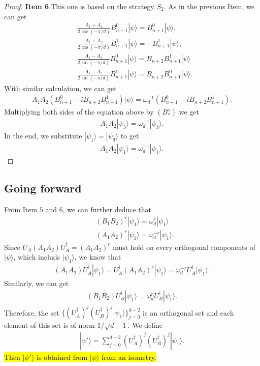 \documentclass[11pt,letterpaper]{article}
\newcommand{\ket}[1]{|#1\rangle}
\newcommand{\ct}{^{\dagger}}
\newcommand{\1}{\mathbb{1}}
\theoremstyle{definition}
\begin{document}
\begin{proof}
	\textbf{Item 6}.This one is based on the strategy $S_2$. As in the previous Item,
	we can get
	\begin{align}
		&\frac{A_1+A_2}{2 \cos(-\pi/d)} B_{n+1}^0 \ket{\psi} = B_{n+1}^0 \ket{\psi}.\\
		&\frac{A_1+A_2}{2 \cos(-\pi/d)} B_{n+1}^1 \ket{\psi} = -B_{n+1}^1 \ket{\psi},\\
		&\frac{A_1-A_2}{2 \sin(-\pi/d)} B_{n+1}^0\ket{\psi} =B_{n+2} B_{n+1}^1\ket{\psi}\\
		&\frac{A_1 -A_2}{2\sin(-\pi/d)} B_{n+1}^1 \ket{\psi} = B_{n+2} B_{n+1}^0 \ket{\psi}.
	\end{align}
	With similar calculation, we can get 
	\begin{align}
		A_1A_2 (B_{n+1}^0 - i B_{n+2}B_{n+1}^1) \ket{\psi} = \omega_d^{-1} (B_{n+1}^0 - i B_{n+2}B_{n+1}^1).
	\end{align}
	Multiplying both sides of the equation above by $(B_\ast^\diamond)$ we get
	\begin{align}
		A_1A_2 \ket{\psi_3} = \omega_d^{-1}\ket{\psi_3}.
	\end{align}
	In the end, we substitute $\ket{\psi_1} = \ket{\psi_3}$ to get
	\begin{align}
		A_1A_2 \ket{\psi_1} = \omega_d^{-1}\ket{\psi_1}.
	\end{align}
\end{proof}
\subsection{Going forward}
From Item $5$ and $6$, we can further deduce that 
\begin{align}
	&(B_1B_2)^r \ket{\psi_1} = \omega_d^r \ket{\psi_1} \\
	&(A_1A_2)^r \ket{\psi_1} = \omega_d^{-r} \ket{\psi_1}.
\end{align}
Since $U_A(A_1A_2)U_A\ct = (A_1A_2)^r$ must hold on every orthogonal components of $\ket{\psi}$, which includs $\ket{\psi_1}$,
we know that 
\begin{align}
	(A_1A_2)U_A\ct \ket{\psi_1} = U_A\ct (A_1A_2)^r \ket{\psi_1} = \omega_d^{-r} U_A\ct \ket{\psi_1}.
\end{align}
Similarly, we can get 
\begin{align}
	(B_1B_2)U_B\ct \ket{\psi_1} = \omega_d^r U_B\ct \ket{\psi_1}.
\end{align}
Therefore, the set $\{ (U_A\ct)^j(U_B\ct)^j \ket{\psi_1}\}_{j=0}^{d-2}$ is an orthogonal set and
each element of this set is of norm $1/\sqrt{d-1}$.
We define 
\begin{align}
	\ket{\psi'} = \sum_{j=0}^{d-2} (U_A\ct)^j(U_B\ct)^j \ket{\psi_1}.
\end{align} 
\hl{Then $\ket{\psi'}$ is obtained from $\ket{\psi}$ from an isometry.}
\end{document}
